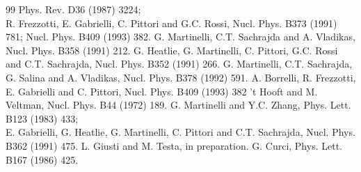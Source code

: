\begin{thebibliography}{99}
 Phys. Rev. D36 (1987) 3224; \\
R. Frezzotti, E. Gabrielli, C. Pittori and
G.C. Rossi, Nucl. Phys. B373 (1991) 781;
Nucl. Phys. B409 (1993) 382.
 G. Martinelli, C.T. Sachrajda
and A. Vladikas, Nucl. Phys. B358 (1991) 212.
 G. Heatlie, G. Martinelli, C. Pittori,
G.C. Rossi and C.T. Sachrajda, Nucl. Phys. B352 (1991) 266.
 G. Martinelli, C.T. Sachrajda, G. Salina
and A. Vladikas, Nucl. Phys. B378 (1992) 591.
 A. Borrelli, R. Frezzotti, E. Gabrielli and C. Pittori,
Nucl. Phys. B409 (1993) 382
 't Hooft and M. Veltman, Nucl. Phys. B44 (1972) 189.
G. Martinelli and Y.C. Zhang, Phys. Lett. B123 (1983) 433; \\
E. Gabrielli, G. Heatlie, G. Martinelli, C. Pittori and
C.T. Sachrajda, Nucl. Phys. B362 (1991) 475.
 L. Giusti and M. Testa, in preparation.
 G. Curci, Phys. Lett. B167 (1986) 425.

\end{thebibliography}
